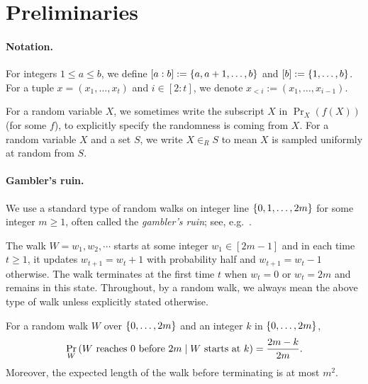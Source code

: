 
\newcommand{\maxwalk}[1]{\ensuremath{\textnormal{\textsf{w}}_{\textnormal{max}}(#1)}}
\newcommand{\timemax}[1]{\ensuremath{\textnormal{\textsf{t}}_{\textnormal{max}}(#1)}}

\newcommand{\maxwalkW}{\ensuremath{\textnormal{\textsf{w}}_{\textnormal{max}}}}
\newcommand{\timemaxW}{\ensuremath{\textnormal{\textsf{t}}_{\textnormal{max}}}}

\newcommand{\dist}{\ensuremath{\mathcal{D}}}



\section{Preliminaries}\label{sec:prelim}

\paragraph{Notation.} For integers $1 \leq a \leq b$, we define $[a:b] := \left\{ a,a+1,\ldots,b \right\}$ and $[b] := \left\{ 1,\ldots,b \right\}$. For a tuple $x=(x_1,\ldots,x_t)$ and $i \in [2:t]$, 
we denote $x_{<i} := (x_1,\ldots,x_{i-1})$.  

For a random variable $X$, we sometimes write the subscript $X$ in $\Pr_X(f(X))$ (for some $f$), to 
explicitly specify the randomness is coming from $X$.  
For a random variable $X$ and a set $S$, we write $X \in_R S$ to mean $X$ is sampled uniformly at random from $S$. 

\paragraph{Gambler's ruin.} We use a standard type of random walks on integer line $\left\{ 0,1,\ldots,2m \right\}$ for some integer $m \geq 1$, often called the \emph{gambler's ruin}; see, e.g.~\cite[Section 2.1]{levin2026markov}. 

The walk $W=w_1,w_2,\cdots$ starts at some integer $w_1 \in [2m-1]$ and in each time $t \geq 1$, it updates $w_{t+1} = w_{t}+1$ with probability half and $w_{t+1} = w_{t}-1$ otherwise. 
The walk terminates at the first time $t$ when $w_t = 0$ or $w_t = 2m$ and remains in this state. Throughout, by a random walk, we always mean the above type of walk unless explicitly stated otherwise. 

\begin{fact}\label{fact:ruin}
	For a random walk $W$ over $\left\{ 0, \ldots, 2m \right\}$ and an integer $k$ in $\left\{ 0,\ldots,2m \right\}$,
	\[
		\operatorname*{\textnormal{Pr}}_{W}\left(\text{$W$ reaches $0$ before $2m$} \mid \text{$W$ starts at $k$}\right) = \frac{2m-k}{2m}. 
	\]
	Moreover, the expected length of the walk before terminating is at most $m^2$. 
\end{fact}

